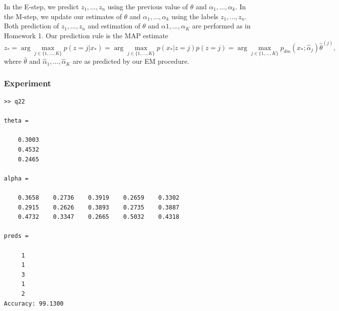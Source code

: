 \documentclass[11pt]{article}
\begin{document}
In the E-step, we predict $z_1,\dots,z_n$ using the previous value of $\theta$
and $\alpha_1,\dots,\alpha_k$. In the M-step, we update our estimates of
$\theta$ and $\alpha_1,\dots,\alpha_k$ using the labels $z_1,\dots,z_n$. Both
prediction of $z_1,\dots,z_n$ and estimation of $\theta$ and
$\alpha1,\dots,\alpha_K$ are performed as in Homework 1. Our prediction rule is
the MAP estimate
\[z_*
    = \arg\!\max_{j \in \{1,\dots,K\}} p(z = j | x_*)
    = \arg\!\max_{j \in \{1,\dots,K\}} p(x_* | z = j)p(z = j)
    = \arg\!\max_{j \in \{1,\dots,K\}} p_{dm}(x_*;\hat\alpha_j)\hat\theta^{(j)},
\]
where $\hat\theta$ and $\hat\alpha_1,\dots,\hat\alpha_K$ are as predicted by
our EM procedure.

\subsubsection{Experiment}
\begin{verbatim}
>> q22

theta =

    0.3003
    0.4532
    0.2465

alpha =

    0.3658    0.2736    0.3919    0.2659    0.3302
    0.2915    0.2626    0.3893    0.2735    0.3887
    0.4732    0.3347    0.2665    0.5032    0.4318

preds =

     1
     1
     3
     1
     2
Accuracy: 99.1300
\end{verbatim}

\newpage
\end{document}
